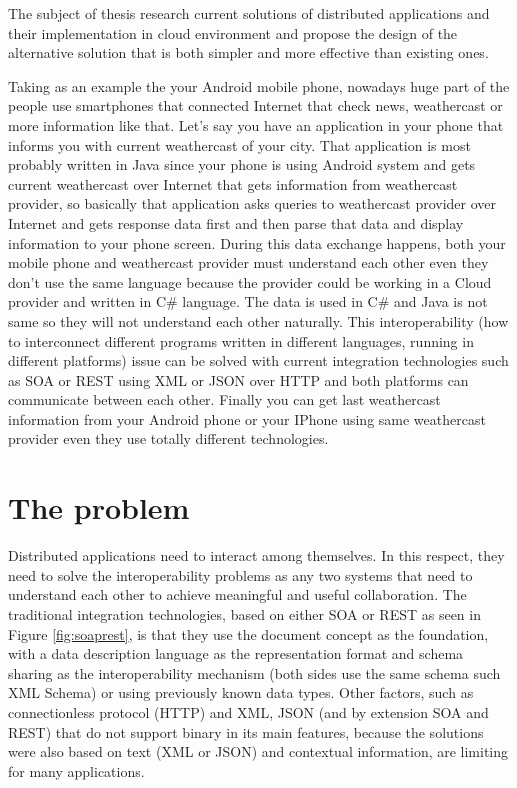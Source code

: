 The subject of thesis research current solutions of distributed applications and their implementation in cloud environment and propose the design of the alternative solution that is both simpler and more effective than existing ones.

Taking as an example the your Android mobile phone, nowadays huge part of the people use smartphones that connected Internet that check news, weathercast or more information like that. Let’s say you have an application in your phone that informs you with current weathercast of your city. That application is most probably written in Java since your phone is using Android system and gets current weathercast over Internet that gets information from weathercast provider, so basically that application asks queries to weathercast provider over Internet and gets response data first and then parse that data and display information to your phone screen. During this data exchange happens, both your mobile phone and weathercast provider must understand each other even they don’t use the same language because the provider could be working in a Cloud provider and written in C\# language. The data is used in C\# and Java is not same so they will not understand each other naturally. This interoperability (how to interconnect different programs written in different languages, running in different platforms) issue can be solved with current integration technologies such as SOA or REST using XML or JSON over HTTP and both platforms can communicate between each other. Finally you can get last weathercast information from your Android phone or your IPhone using same weathercast provider even they use totally different technologies.

\section{The problem}
\label{section:problem}

Distributed applications need to interact among themselves. In this respect, they need to solve the interoperability problems as any two systems that need to understand each other to achieve meaningful and useful collaboration. The traditional integration technologies, based on either SOA or REST as seen in Figure \ref{fig:soaprest}, is that they use the document concept as the foundation, with a data description language as the representation format and schema sharing as the interoperability mechanism (both sides use the same schema such XML Schema) or using previously known data types. Other factors, such as connectionless protocol (HTTP) and XML, JSON (and by extension SOA and REST) that do not support binary in its main features, because the solutions were also based on text (XML or JSON) and contextual information, are limiting for many applications.

